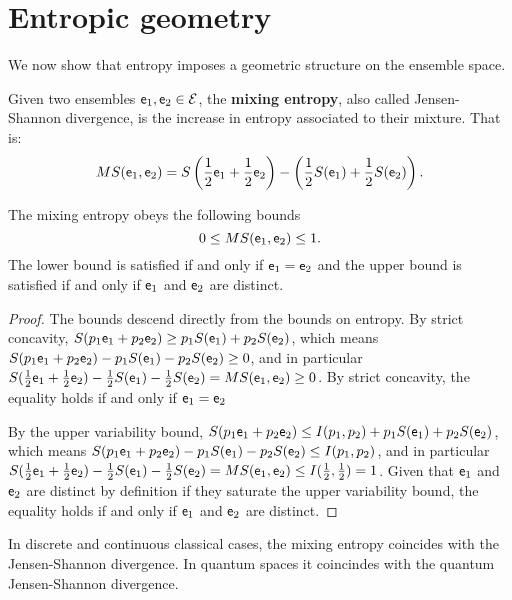 \section{Entropic geometry}

We now show that entropy imposes a geometric structure on the ensemble space.

\begin{defn}
	Given two ensembles $\mathsf{e}_1, \mathsf{e}_2 \in \mathcal{E}$, the \textbf{mixing entropy}, also called Jensen-Shannon divergence, is the increase in entropy associated to their mixture. That is:
	$$MS(\mathsf{e}_1, \mathsf{e}_2) = S\left(\frac{1}{2}\mathsf{e}_1 + \frac{1}{2} \mathsf{e}_2\right) - \left(\frac{1}{2} S(\mathsf{e}_1) + \frac{1}{2} S(\mathsf{e}_2)\right).$$
\end{defn}

\begin{coro}
	The mixing entropy obeys the following bounds
	$$ 0 \leq MS(\mathsf{e}_1, \mathsf{e}_2) \leq 1.$$
	The lower bound is satisfied if and only if $\mathsf{e}_1 = \mathsf{e}_2$ and the upper bound is satisfied if and only if $\mathsf{e}_1$ and $\mathsf{e}_2$ are distinct.
\end{coro}

\begin{proof}
	The bounds descend directly from the bounds on entropy. By strict concavity, $S(p_1\mathsf{e}_1 + p_2 \mathsf{e}_2) \geq p_1 S(\mathsf{e}_1) + p_2 S(\mathsf{e}_2)$, which means $S(p_1\mathsf{e}_1 + p_2 \mathsf{e}_2) - p_1 S(\mathsf{e}_1) - p_2 S(\mathsf{e}_2) \geq 0$, and in particular $S(\frac{1}{2} \mathsf{e}_1 + \frac{1}{2} \mathsf{e}_2) - \frac{1}{2} S(\mathsf{e}_1) - \frac{1}{2} S(\mathsf{e}_2) = MS(\mathsf{e}_1, \mathsf{e}_2) \geq 0$. By strict concavity, the equality holds if and only if $\mathsf{e}_1 = \mathsf{e}_2$
	
	By the upper variability bound, $S(p_1\mathsf{e}_1 + p_2 \mathsf{e}_2) \leq I(p_1, p_2) + p_1 S(\mathsf{e}_1) + p_2 S(\mathsf{e}_2)$, which means $S(p_1\mathsf{e}_1 + p_2 \mathsf{e}_2) - p_1 S(\mathsf{e}_1) - p_2 S(\mathsf{e}_2) \leq I(p_1, p_2)$, and in particular $S(\frac{1}{2} \mathsf{e}_1 + \frac{1}{2} \mathsf{e}_2) - \frac{1}{2} S(\mathsf{e}_1) - \frac{1}{2} S(\mathsf{e}_2) = MS(\mathsf{e}_1, \mathsf{e}_2) \leq I(\frac{1}{2}, \frac{1}{2}) = 1$. Given that $\mathsf{e}_1$ and $\mathsf{e}_2$ are distinct by definition if they saturate the upper variability bound, the equality holds if and only if $\mathsf{e}_1$ and $\mathsf{e}_2$ are distinct.
\end{proof}

\begin{prop}
	In discrete and continuous classical cases, the mixing entropy coincides with the Jensen-Shannon divergence. In quantum spaces it coincindes with the quantum Jensen-Shannon divergence.
\end{prop}


